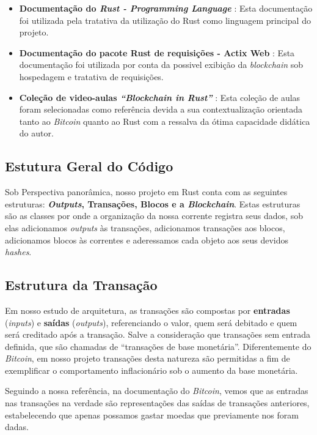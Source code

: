 \documentclass[article,12pt,oneside,a4paper,english,brazil]{unifil}
\begin{document}
\begin{Spacing}{1.5}
\begin{itemize}
    \item \textbf{Documentação do \textit{Rust - Programming Language}} \cite{rust_learn}: Esta documentação foi utilizada pela tratativa da utilização do Rust como linguagem principal do projeto.

    \item \textbf{Documentação do pacote Rust de requisições - Actix Web} \cite{actix_docs}: Esta documentação foi utilizada por conta da possivel exibição da \textit{blockchain} sob hospedagem e tratativa de requisições.

    \item \textbf{Coleção de video-aulas \textit{``Blockchain in Rust''}} \cite{geeklaunch_rust}: Esta coleção de aulas foram selecionadas como referência devida a sua contextualização orientada tanto ao \textit{Bitcoin} quanto ao Rust com a ressalva da ótima capacidade didática do autor.
\end{itemize}

\subsection*{Estutura Geral do Código}

Sob Perspectiva panorâmica, nosso projeto em Rust conta com as seguintes estruturas: \textbf{\textit{Outputs}, Transações, Blocos e a \textit{Blockchain}}. Estas estruturas são as classes por onde a organização da nossa corrente registra seus dados, sob elas adicionamos \textit{outputs} às transações, adicionamos transações aos blocos, adicionamos blocos às correntes e aderessamos cada objeto aos seus devidos \textit{hashes}.

\subsection*{Estrutura da Transação}

Em nosso estudo de arquitetura, as transações são compostas por
\textbf{entradas} (\textit{inputs}) e \textbf{saídas} (\textit{outputs}), referenciando o valor, quem será debitado e quem será creditado após a transação. Salve a consideração que transações sem entrada definida, que são chamadas de ``transações de base monetária''. Diferentemente do \textit{Bitcoin}, em nosso projeto transações desta natureza são permitidas a fim de exemplificar o comportamento inflacionário sob o aumento da base monetária.

Seguindo a nossa referência, na documentação do \textit{Bitcoin}, vemos que as entradas nas transações na verdade são representações das saídas de transações anteriores, estabelecendo que apenas possamos gastar moedas que previamente nos foram dadas.


\end{Spacing}
\end{document}
